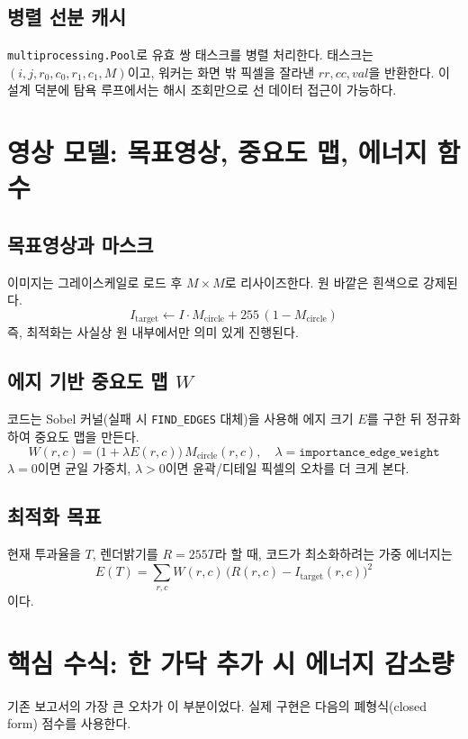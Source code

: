 \documentclass[11pt,a4paper]{article}
\begin{document}
\subsection{병렬 선분 캐시}
\texttt{multiprocessing.Pool}로 유효 쌍 태스크를 병렬 처리한다.
태스크는 \((i,j,r_0,c_0,r_1,c_1,M)\)이고,
워커는 화면 밖 픽셀을 잘라낸 \(rr,cc,val\)을 반환한다.
이 설계 덕분에 탐욕 루프에서는 해시 조회만으로 선 데이터 접근이 가능하다.

\section{영상 모델: 목표영상, 중요도 맵, 에너지 함수}
\subsection{목표영상과 마스크}
이미지는 그레이스케일로 로드 후 \(M\times M\)로 리사이즈한다.
원 바깥은 흰색으로 강제된다.
\begin{equation}
I_{\mathrm{target}} \leftarrow I\cdot M_{\mathrm{circle}} + 255\,(1-M_{\mathrm{circle}})
\end{equation}
즉, 최적화는 사실상 원 내부에서만 의미 있게 진행된다.

\subsection{에지 기반 중요도 맵 \(W\)}
코드는 Sobel 커널(실패 시 \texttt{FIND\_EDGES} 대체)을 사용해 에지 크기 \(E\)를 구한 뒤
정규화하여 중요도 맵을 만든다.
\begin{equation}
W(r,c)=\bigl(1+\lambda E(r,c)\bigr)\,M_{\mathrm{circle}}(r,c),\quad \lambda=\texttt{importance\_edge\_weight}
\end{equation}
\(\lambda=0\)이면 균일 가중치, \(\lambda>0\)이면 윤곽/디테일 픽셀의 오차를 더 크게 본다.

\subsection{최적화 목표}
현재 투과율을 \(T\), 렌더밝기를 \(R=255T\)라 할 때,
코드가 최소화하려는 가중 에너지는
\begin{equation}
E(T)=\sum_{r,c} W(r,c)\,\bigl(R(r,c)-I_{\mathrm{target}}(r,c)\bigr)^2
\end{equation}
이다.

\section{핵심 수식: 한 가닥 추가 시 에너지 감소량}
기존 보고서의 가장 큰 오차가 이 부분이었다.
실제 구현은 다음의 폐형식(closed form) 점수를 사용한다.
\end{document}
